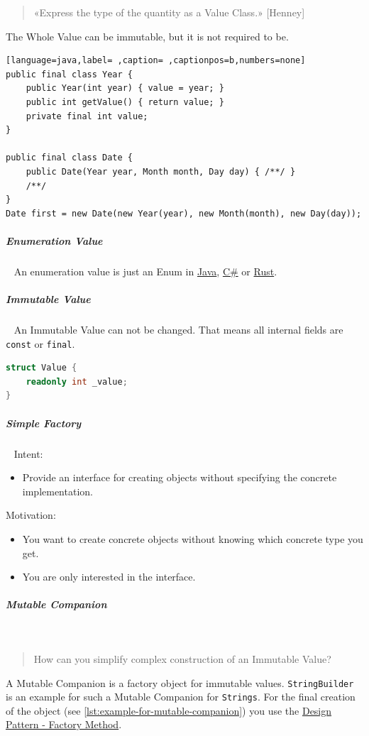 \documentclass[11pt,twoside,landscape]{article}
\begin{document}
\begin{multicols}{3}
\begin{quote}
«Express the type of the quantity as a Value Class.» [Henney]
\end{quote}

The Whole Value can be immutable, but it is not required to be.

\begin{lstlisting}[language=java,label= ,caption= ,captionpos=b,numbers=none]
public final class Year {
    public Year(int year) { value = year; }
    public int getValue() { return value; }
    private final int value;
}

public final class Date {
    public Date(Year year, Month month, Day day) { /**/ }
    /**/
}
Date first = new Date(new Year(year), new Month(month), new Day(day));
\end{lstlisting}
\subparagraph{Enumeration Value} \
\label{sec:org6c7ecf3}
An enumeration value is just an Enum in \href{../../../roam/20201116150053-java.org}{Java}, \href{../../../roam/20211003114158-c.org}{C\#} or \href{../../../roam/20200904153952-rust.org}{Rust}.
\subparagraph{Immutable Value} \
\label{sec:orge4d029d}
An Immutable Value can not be changed.
That means all internal fields are \texttt{const} or \texttt{final}.

\begin{lstlisting}[language=csharp,label=lst:example-for-immutable-value,caption={Example for Immutable Value},captionpos=b,numbers=none]
struct Value {
    readonly int _value;
}
\end{lstlisting}
\subparagraph{Simple Factory} \
\label{sec:orgc3304af}
Intent:
\begin{itemize}
\item Provide an interface for creating objects without specifying the concrete implementation.
\end{itemize}

Motivation:
\begin{itemize}
\item You want to create concrete objects without knowing which concrete type you get.
\item You are only interested in the interface.
\end{itemize}
\subparagraph{Mutable Companion} \
\label{sec:org23ae38d}
\begin{quote}
How can you simplify complex construction of an Immutable Value?
\end{quote}


A Mutable Companion is a factory object for immutable values.
\texttt{StringBuilder} is an example for such a Mutable Companion for \texttt{Strings}.
For the final creation of the object (see \autoref{lst:example-for-mutable-companion}) you use the \href{../../../roam/20220413195351-design_pattern_factory_method.org}{Design Pattern - Factory Method}.


\end{multicols}
\end{document}
